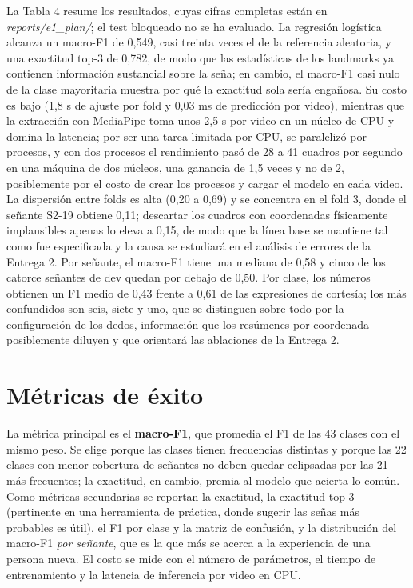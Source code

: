 \documentclass[11pt,a4paper]{article}
\newcommand{\code}[1]{\textit{#1}}
\begin{document}
La Tabla 4 resume los resultados, cuyas cifras completas están en \code{reports/e1\_plan/}; el test bloqueado no se ha evaluado. La regresión logística alcanza un macro-F1 de 0,549, casi treinta veces el de la referencia aleatoria, y una exactitud top-3 de 0,782, de modo que las estadísticas de los landmarks ya contienen información sustancial sobre la seña; en cambio, el macro-F1 casi nulo de la clase mayoritaria muestra por qué la exactitud sola sería engañosa. Su costo es bajo (1,8 s de ajuste por fold y 0,03 ms de predicción por video), mientras que la extracción con MediaPipe toma unos 2,5 s por video en un núcleo de CPU y domina la latencia; por ser una tarea limitada por CPU, se paralelizó por procesos, y con dos procesos el rendimiento pasó de 28 a 41 cuadros por segundo en una máquina de dos núcleos, una ganancia de 1,5 veces y no de 2, posiblemente por el costo de crear los procesos y cargar el modelo en cada video. La dispersión entre folds es alta (0,20 a 0,69) y se concentra en el fold 3, donde el señante S2-19 obtiene 0,11; descartar los cuadros con coordenadas físicamente implausibles apenas lo eleva a 0,15, de modo que la línea base se mantiene tal como fue especificada y la causa se estudiará en el análisis de errores de la Entrega 2. Por señante, el macro-F1 tiene una mediana de 0,58 y cinco de los catorce señantes de dev quedan por debajo de 0,50. Por clase, los números obtienen un F1 medio de 0,43 frente a 0,61 de las expresiones de cortesía; los más confundidos son seis, siete y uno, que se distinguen sobre todo por la configuración de los dedos, información que los resúmenes por coordenada posiblemente diluyen y que orientará las ablaciones de la Entrega 2.

\section{Métricas de éxito}

La métrica principal es el \textbf{macro-F1}, que promedia el F1 de las 43 clases con el mismo peso. Se elige porque las clases tienen frecuencias distintas y porque las 22 clases con menor cobertura de señantes no deben quedar eclipsadas por las 21 más frecuentes; la exactitud, en cambio, premia al modelo que acierta lo común. Como métricas secundarias se reportan la exactitud, la exactitud top-3 (pertinente en una herramienta de práctica, donde sugerir las señas más probables es útil), el F1 por clase y la matriz de confusión, y la distribución del macro-F1 \emph{por señante}, que es la que más se acerca a la experiencia de una persona nueva. El costo se mide con el número de parámetros, el tiempo de entrenamiento y la latencia de inferencia por video en CPU.
\end{document}
